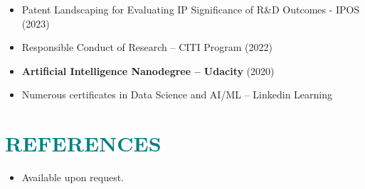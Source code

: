 \documentclass[a4paper, 11pt]{article}
\begin{document}
	\begin{itemize}[leftmargin=*, itemsep=-1mm]
		
		\item Patent Landscaping for Evaluating IP Significance of R\&D Outcomes - IPOS (2023)
		
		\item Responsible Conduct of Research – CITI Program (2022)
		
		\item {\bf Artificial Intelligence Nanodegree – Udacity} (2020)
		
		\item Numerous certificates in Data Science and AI/ML – Linkedin Learning
		
	\end{itemize}
	
	
\section{\textcolor{teal}{\bf{REFERENCES}}}

	\vspace{3pt}
	
	\begin{itemize}[leftmargin=*, itemsep=-1mm]
		
		\item Available upon request.
		
	\end{itemize}
	
	
			
\end{document}
